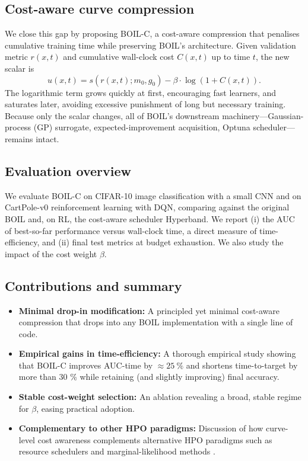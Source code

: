 \documentclass{article} %
\begin{document}
\subsection{Cost-aware curve compression}
We close this gap by proposing BOIL-C, a cost-aware compression that penalises cumulative training time while preserving BOIL's architecture. Given validation metric \(r(x,t)\) and cumulative wall-clock cost \(C(x,t)\) up to time \(t\), the new scalar is
\[
 u(x,t)=s(r(x,t);m_0,g_0)-\beta\cdot\log(1+C(x,t)).
\]
The logarithmic term grows quickly at first, encouraging fast learners, and saturates later, avoiding excessive punishment of long but necessary training. Because only the scalar changes, all of BOIL's downstream machinery—Gaussian-process (GP) surrogate, expected-improvement acquisition, Optuna scheduler—remains intact.

\subsection{Evaluation overview}
We evaluate BOIL-C on CIFAR-10 image classification with a small CNN and on CartPole-v0 reinforcement learning with DQN, comparing against the original BOIL and, on RL, the cost-aware scheduler Hyperband. We report (i) the AUC of best-so-far performance versus wall-clock time, a direct measure of time-efficiency, and (ii) final test metrics at budget exhaustion. We also study the impact of the cost weight \(\beta\).

\subsection{Contributions and summary}
\begin{itemize}
  \item \textbf{Minimal drop-in modification:} A principled yet minimal cost-aware compression that drops into any BOIL implementation with a single line of code.
  \item \textbf{Empirical gains in time-efficiency:} A thorough empirical study showing that BOIL-C improves AUC-time by \(\approx 25\ \%\) and shortens time-to-target by more than 30 \% while retaining (and slightly improving) final accuracy.
  \item \textbf{Stable cost-weight selection:} An ablation revealing a broad, stable regime for \(\beta\), easing practical adoption.
  \item \textbf{Complementary to other HPO paradigms:} Discussion of how curve-level cost awareness complements alternative HPO paradigms such as resource schedulers and marginal-likelihood methods \cite{mlodozeniec-2023-hyperparameter}.
\end{itemize}
\end{document}

